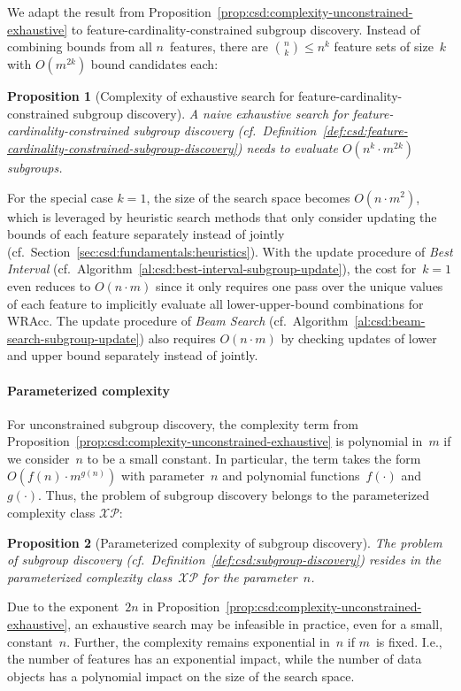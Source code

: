 \documentclass{article}
\newtheorem{proposition}{Proposition}
\theoremstyle{definition}
\begin{document}
We adapt the result from Proposition~\ref{prop:csd:complexity-unconstrained-exhaustive} to feature-cardinality-constrained subgroup discovery.
Instead of combining bounds from all $n$~features, there are $\binom{n}{k} \leq n^k$ feature sets of size~$k$ with $O(m^{2k})$ bound candidates each:
%
\begin{proposition}[Complexity of exhaustive search for feature-cardinality-constrained subgroup discovery]
	A naive exhaustive search for feature-cardinality-constrained subgroup discovery (cf.~Definition~\ref{def:csd:feature-cardinality-constrained-subgroup-discovery}) needs to evaluate $O(n^k \cdot m^{2k})$ subgroups.
	\label{prop:csd:complexity-cardinality-exhaustive}
\end{proposition}
%
For the special case $k=1$, the size of the search space becomes $O(n \cdot m^2)$, which is leveraged by heuristic search methods that only consider updating the bounds of each feature separately instead of jointly (cf.~Section~\ref{sec:csd:fundamentals:heuristics}).
With the update procedure of \emph{Best Interval} (cf.~Algorithm~\ref{al:csd:best-interval-subgroup-update}), the cost for~$k=1$ even reduces to $O(n \cdot m)$ since it only requires one pass over the unique values of each feature to implicitly evaluate all lower-upper-bound combinations for WRAcc.
The update procedure of \emph{Beam Search} (cf.~Algorithm~\ref{al:csd:beam-search-subgroup-update}) also requires $O(n \cdot m)$ by checking updates of lower and upper bound separately instead of jointly.

\paragraph{Parameterized complexity}

For unconstrained subgroup discovery, the complexity term from Proposition~\ref{prop:csd:complexity-unconstrained-exhaustive} is polynomial in~$m$ if we consider~$n$ to be a small constant.
In particular, the term takes the form $O(f(n) \cdot m^{g(n)})$ with parameter~$n$ and polynomial functions~$f(\cdot)$ and~$g(\cdot)$.
Thus, the problem of subgroup discovery belongs to the parameterized complexity class $\mathcal{XP}$:
%
\begin{proposition}[Parameterized complexity of subgroup discovery]
	The problem of subgroup discovery (cf.~Definition~\ref{def:csd:subgroup-discovery}) resides in the parameterized complexity class~$\mathcal{XP}$ for the parameter~$n$.
	\label{prop:csd:complexity-unconstrained-xp}
\end{proposition}
%
Due to the exponent~$2n$ in Proposition~\ref{prop:csd:complexity-unconstrained-exhaustive}, an exhaustive search may be infeasible in practice, even for a small, constant~$n$.
Further, the complexity remains exponential in~$n$ if $m$~is fixed.
I.e., the number of features has an exponential impact, while the number of data objects has a polynomial impact on the size of the search space.
\end{document}
